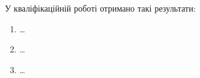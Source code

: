 
У кваліфікаційній роботі отримано такі результати:

\begin{enumerate}
  \item \dots
  \item \dots
  \item \dots
\end{enumerate}
